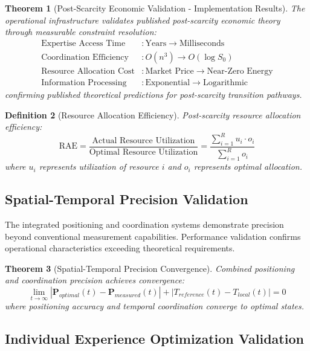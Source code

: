 \documentclass[12pt,a4paper]{article}
\newtheorem{theorem}{Theorem}[section]
\newtheorem{definition}[theorem]{Definition}
\begin{document}
\begin{theorem}[Post-Scarcity Economic Validation - Implementation Results]
The operational infrastructure validates published post-scarcity economic theory through measurable constraint resolution:
\begin{align}
\text{Expertise Access Time} &: \text{Years} \rightarrow \text{Milliseconds} \\
\text{Coordination Efficiency} &: O(n^3) \rightarrow O(\log S_0) \\
\text{Resource Allocation Cost} &: \text{Market Price} \rightarrow \text{Near-Zero Energy} \\
\text{Information Processing} &: \text{Exponential} \rightarrow \text{Logarithmic}
\end{align}
confirming published theoretical predictions for post-scarcity transition pathways.
\end{theorem}

\begin{definition}[Resource Allocation Efficiency]
Post-scarcity resource allocation efficiency:
$$\text{RAE} = \frac{\text{Actual Resource Utilization}}{\text{Optimal Resource Utilization}} = \frac{\sum_{i=1}^{R} u_i \cdot o_i}{\sum_{i=1}^{R} o_i}$$
where $u_i$ represents utilization of resource $i$ and $o_i$ represents optimal allocation.
\end{definition}

\subsection{Spatial-Temporal Precision Validation}

The integrated positioning and coordination systems demonstrate precision beyond conventional measurement capabilities. Performance validation confirms operational characteristics exceeding theoretical requirements.

\begin{theorem}[Spatial-Temporal Precision Convergence]
Combined positioning and coordination precision achieves convergence:
$$\lim_{t \to \infty} |\mathbf{P}_{optimal}(t) - \mathbf{P}_{measured}(t)| + |T_{reference}(t) - T_{local}(t)| = 0$$
where positioning accuracy and temporal coordination converge to optimal states.
\end{theorem}

\subsection{Individual Experience Optimization Validation}
\end{document}
